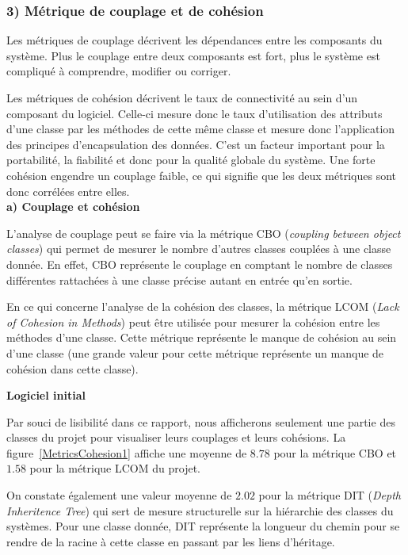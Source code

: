 \documentclass[12pt, openany]{report}
\begin{document}
\newpage

\subsubsection*{\textbf{\large{3) Métrique de couplage et de cohésion}}}



Les métriques de couplage décrivent les dépendances entre les composants du système. Plus le couplage entre deux composants est fort, plus le système est compliqué à comprendre, modifier ou corriger.


Les métriques de cohésion décrivent le taux de connectivité au sein d’un composant du
logiciel. Celle-ci mesure donc le taux d’utilisation des attributs d’une classe par les méthodes de cette même classe et mesure donc l’application des principes d’encapsulation des données. C’est un facteur important pour la portabilité, la fiabilité et donc pour la qualité globale du système. Une forte cohésion engendre un couplage faible, ce qui signifie que les deux métriques sont donc corrélées entre elles.\\

\textbf{a) Couplage et cohésion}


L'analyse de couplage peut se faire via la métrique CBO (\textit{coupling between object classes}) qui permet de mesurer le nombre d'autres classes couplées à une classe donnée. En effet, CBO représente le couplage en comptant le nombre de classes différentes rattachées à une classe précise autant en entrée qu'en sortie.

En ce qui concerne l'analyse de la cohésion des classes, la métrique LCOM (\textit{Lack of Cohesion in Methods}) peut être utilisée pour mesurer la cohésion entre les méthodes d'une classe. Cette métrique représente le manque de cohésion au sein d'une classe (une grande valeur pour cette métrique représente un manque de cohésion dans cette classe).

\textbf{Logiciel initial}

Par souci de lisibilité dans ce rapport, nous afficherons seulement une partie des classes du projet pour visualiser leurs couplages et leurs cohésions. La figure~\ref{MetricsCohesion1} affiche une moyenne de $8.78$ pour la métrique CBO et $1.58$ pour la métrique LCOM du projet. 


On constate également une valeur moyenne de $2.02$ pour la métrique DIT (\textit{Depth Inheritence Tree}) qui sert de mesure structurelle sur la hiérarchie des classes du systèmes. Pour une classe donnée, DIT représente la longueur du chemin pour se rendre de la racine à cette classe en passant par les liens d'héritage.
\end{document}
